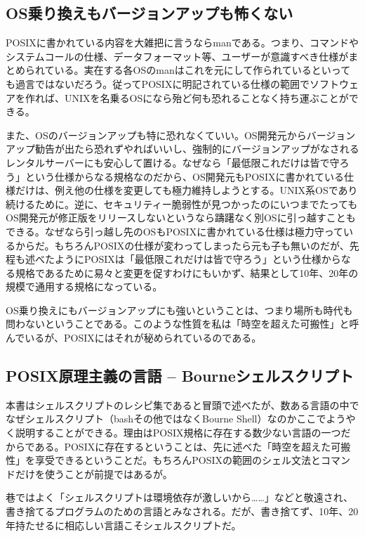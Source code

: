 \subsection*{OS乗り換えもバージョンアップも怖くない}

POSIXに書かれている内容を大雑把に言うならmanである。つまり、コマンドやシステムコールの仕様、データフォーマット等、ユーザーが意識すべき仕様がまとめられている。実在する各OSのmanはこれを元にして作られているといっても過言ではないだろう。従ってPOSIXに明記されている仕様の範囲でソフトウェアを作れば、UNIXを名乗るOSになら殆ど何も恐れることなく持ち運ぶことができる。

また、OSのバージョンアップも特に恐れなくていい。OS開発元からバージョンアップ勧告が出たら恐れずやればいいし、強制的にバージョンアップがなされるレンタルサーバーにも安心して置ける。なぜなら「最低限これだけは皆で守ろう」という仕様からなる規格なのだから、OS開発元もPOSIXに書かれている仕様だけは、例え他の仕様を変更しても極力維持しようとする。UNIX系OSであり続けるために。逆に、セキュリティー脆弱性が見つかったのにいつまでたってもOS開発元が修正版をリリースしないというなら躊躇なく別OSに引っ越すこともできる。なぜなら引っ越し先のOSもPOSIXに書かれている仕様は極力守っているからだ。もちろんPOSIXの仕様が変わってしまったら元も子も無いのだが、先程も述べたようにPOSIXは「最低限これだけは皆で守ろう」という仕様からなる規格であるために易々と変更を促すわけにもいかず、結果として10年、20年の規模で通用する規格になっている。

OS乗り換えにもバージョンアップにも強いということは、つまり場所も時代も問わないということである。このような性質を私は「時空を超えた可搬性」と呼んでいるが、POSIXにはそれが秘められているのである。

\subsection*{POSIX原理主義の言語 -- Bourneシェルスクリプト}

本書はシェルスクリプトのレシピ集であると冒頭で述べたが、数ある言語の中でなぜシェルスクリプト（bashその他ではなくBourne Shell）なのかここでようやく説明することができる。理由はPOSIX規格に存在する数少ない言語の一つだからである。POSIXに存在するということは、先に述べた「時空を超えた可搬性」を享受できるということだ。もちろんPOSIXの範囲のシェル文法とコマンドだけを使うことが前提ではあるが。

巷ではよく「シェルスクリプトは環境依存が激しいから……」などと敬遠され、書き捨てるプログラムのための言語とみなされる。だが、書き捨てず、10年、20年持たせるに相応しい言語こそシェルスクリプトだ。

